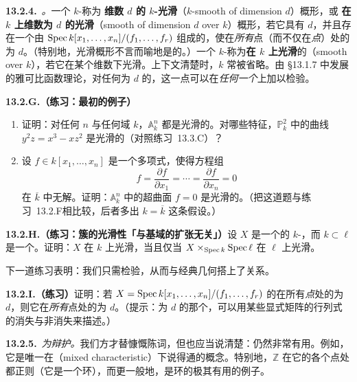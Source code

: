 \textbf{13.2.4.}\ \emph{\trhDefinition{}。}\quad 一个 $k$-\trScheme{}称为 \textbf{维数 $d$ 的 $k$-光滑}（$k$-smooth of dimension $d$）概形，或 \textbf{在 $k$ 上维数为 $d$ 的光滑}（smooth of dimension $d$ over $k$）概形，若它具有\trPureDimension{} $d$，并且存在一个由\trAffine\trOpenSubset{} $\operatorname{Spec} k[x_1,\dots,x_n]/(f_1,\dots,f_r)$ 组成的\trCover，使\trJacobianMatrix{}在\emph{所有}点（而不仅在\emph{\trClosed{}点}）处的\trCorank{}为 $d$。（特别地，光滑概形不言而喻地是\trLocally\trFiniteType{}的。）一个 $k$-\trScheme{}称为\textbf{在 $k$ 上光滑}的（smooth over $k$），若它在某个维数下光滑。上下文清楚时，$k$ 常被省略。由 \S13.1.7 中发展的雅可比\trCorank{}函数理论，对任何\trPureDimension{}为 $d$ 的\trVariety，这一点可以在\emph{任何一个}\trAffine\trOpenCover{}上加以检验。

\textbf{13.2.G.（练习：最初的例子）}
\begin{enumerate}[label=(\alph*)]
\item 证明：对任何 $n$ 与任何域 $k$，$\mathbb{A}^n_k$ 都是光滑的。对哪些特征，$\mathbb{P}^2_k$ 中的曲线 $y^2z=x^3-xz^2$ 是光滑的（对照\mbox{练习~13.3.C}）？
\item 设 $f\in k[x_1,\dots,x_n]$ 是一个多项式，使得方程组
\[
f=\frac{\partial f}{\partial x_1}=\cdots=\frac{\partial f}{\partial x_n}=0
\]
在 $\overline{k}$ 中无解。证明：$\mathbb{A}^n_k$ 中的超曲面 $f=0$ 是光滑的。（把这道题与\mbox{练习~13.2.F}相比较，后者多出 $k=\overline{k}$ 这条假设。）
\end{enumerate}

\textbf{13.2.H.（练习：簇的光滑性「与基域的扩张无关」）}\quad 设 $X$ 是一个\trLocally\trFiniteType{}的 $k$-\trScheme，而 $k\subset\ell$ 是一个\trFieldExtension。证明：$X$ 在 $k$ 上光滑，当且仅当 $X\times_{\operatorname{Spec} k}\operatorname{Spec}\ell$ 在 $\ell$ 上光滑。

下一道练习表明：我们只需检验\trClosedPoint{}，从而与经典几何搭上了关系。

\textbf{13.2.I.（练习）}\quad 证明：若 $X=\operatorname{Spec} k[x_1,\dots,x_n]/(f_1,\dots,f_r)$ 的\trJacobianMatrix{}在所有\emph{\trClosed{}点}处的\trCorank{}为 $d$，则它在\emph{所有}点处的\trCorank{}为 $d$。（提示：\trJacobianMatrix{}\trCorank{}为 $d$ 的那个\trLocus，可以用某些显式矩阵的行列式的消失与非消失来描述。）

\textbf{13.2.5.}\ \emph{为\trRegularity{}辩护。}\quad 我们方才替\trSmoothness{}慷慨陈词，但也应当说清楚：\trRegularity{}仍然非常有用。例如，它是唯一在\trMixedCharacteristic（mixed characteristic）下说得通的概念。特别地，$\mathbb{Z}$ 在它的各个点处都正则（它是一个\trRegular{}环），而更一般地，\trDVR{}是\trRegular{}环的极其有用的例子。

